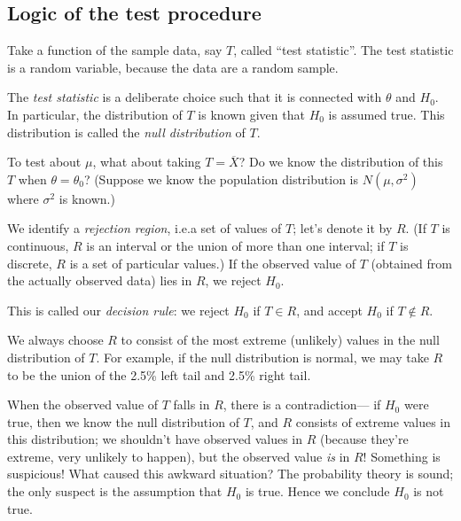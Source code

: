 \documentclass[12pt]{article}
\begin{document}

\subsection{Logic of the test procedure}

Take a function of the sample data, say $T$, called ``test statistic''.
The test statistic is a random variable, because the data are a random
sample.

The \emph{test statistic} is a deliberate choice
such that it is connected with $\theta$ and $H_0$.
In particular, the distribution of $T$ is known given that $H_0$ is
assumed true. This distribution is called
the \emph{null distribution} of $T$.

\example
To test about $\mu$, what about taking $T = \overline{X}$?
Do we know the distribution of this $T$ when
$\theta = \theta_0$?
(Suppose we know the population distribution is
$N(\mu, \sigma^2)$ where $\sigma^2$ is known.)

We identify a \emph{rejection region}, i.e.\@ a set of values of $T$;
let's denote it by $R$.
(If $T$ is continuous, $R$ is an interval or the union of more than one
interval; if $T$ is discrete, $R$ is a set of particular values.)
If the observed value of $T$ (obtained from the actually observed data)
lies in $R$, we reject $H_0$.

This is called our \emph{decision rule}:
we reject $H_0$ if $T \in R$, and accept $H_0$ if $T \notin R$.

We always choose $R$ to consist of the most extreme (\ie unlikely)
values in the null distribution of $T$.
For example, if the null distribution is normal,
we may take $R$ to be the union of the 2.5\% left tail and 2.5\% right
tail.

When the observed value of $T$ falls in $R$, there is a
contradiction---%
if $H_0$ were true, then we know the null distribution of $T$,
and $R$ consists of extreme values in this distribution;
we shouldn't have observed values in $R$
(because they're extreme, \ie very unlikely to happen),
but the observed value \emph{is} in $R$!
Something is suspicious! What caused this awkward situation?
The probability theory is sound; the only suspect is
the assumption that $H_0$ is true.
Hence we conclude $H_0$ is not true.
\end{document}
